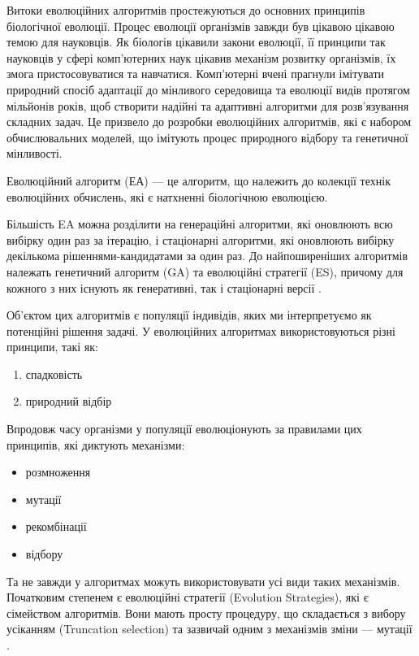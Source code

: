 Витоки еволюційних алгоритмів простежуються до основних принципів 
біологічної еволюції. 
Процес еволюції організмів завжди був цікавою цікавою темою для науковців.
Як біологів цікавили закони еволюції, її принципи так науковців у сфері 
комп'ютерних наук цікавив механізм розвитку організмів, їх змога пристосовуватися
та навчатися.
Комп'ютерні вчені прагнули імітувати природний спосіб 
адаптації до мінливого середовища та еволюції видів протягом 
мільйонів років, щоб створити надійні та адаптивні алгоритми для 
розв'язування складних задач. Це призвело до розробки еволюційних алгоритмів,
які є набором обчислювальних моделей, що імітують процес природного відбору 
та генетичної мінливості.

\begin{definition}
Еволюційний алгоритм (ЕА) --- це алгоритм, що належить до колекції технік 
еволюційних обчислень, які є натхненні біологічною еволюцією.
\end{definition}

Більшість EA можна розділити на генераційні алгоритми, які оновлюють 
всю вибірку один раз за ітерацію, і стаціонарні алгоритми, які 
оновлюють вибірку декількома рішеннями-кандидатами за один раз. 
До найпоширеніших алгоритмів належать генетичний алгоритм (GA) 
та еволюційні стратегії (ES), причому для кожного з них існують 
як генеративні, так і стаціонарні версії \cite{lukeEssentialsMetaheuristicsSet2013}.

Об'єктом цих алгоритмів є популяції індивідів, яких ми інтерпретуємо 
як потенційні рішення задачі. 
У еволюційних алгоритмах використовуються різні принципи, такі як:
\begin{enumerate}
  \item спадковість
  \item природний відбір
\end{enumerate}

Впродовж часу організми у популяції еволюціонують за правилами цих принципів, які
диктують механізми:
\begin{itemize}
  \item розмноження
  \item мутації
  \item рекомбінації
  \item відбору
\end{itemize}

Та не завжди у алгоритмах можуть використовувати усі види таких механізмів.
Початковим степенем є еволюційні стратегії (Evolution Strategies), які є сімейством
алгоритмів. Вони мають просту процедуру, що складається з вибору
усіканням (Truncation selection) та зазвичай одним
з механізмів зміни --- мутації \cite{lukeEssentialsMetaheuristicsSet2013}.

